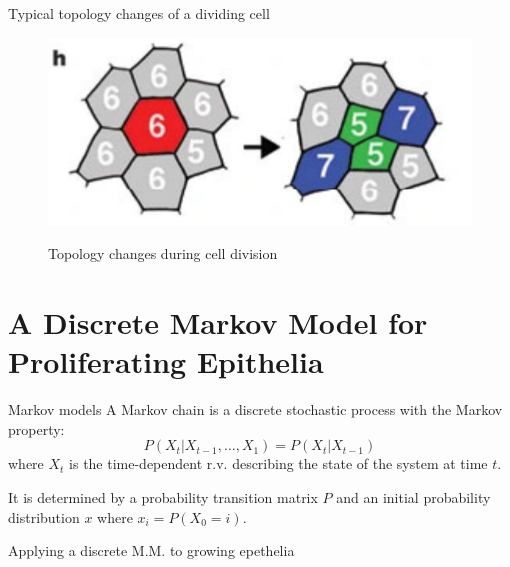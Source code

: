 \documentclass[aspectratio=169, 10pt]{beamer}
\begin{document}
\begin{frame}[fragile]{Typical topology changes of a dividing cell}
  \begin{figure}[]
    \centering
    \caption{Topology changes during cell division}
    \includegraphics[width=.5\textwidth]{figures/topology_evolution.png} 
    \label{}
  \end{figure}
\end{frame}

\section{A Discrete Markov Model for Proliferating Epithelia}

\begin{frame}[fragile]{Markov models}
    A Markov chain is a discrete stochastic process with the Markov property:
    \begin{equation*}
      P(X_t|X_{t-1},\ldots,X_1)=P(X_t|X_{t-1})
    \end{equation*}
    where $X_t$ is the time-dependent r.v. describing the state of the system at time $t$. 
    
    It is determined by a probability transition matrix $P$ and an initial probability distribution $x$ where $x_i=P(X_0=i)$. 

\end{frame}

\begin{frame}[fragile]{Applying a discrete M.M. to growing epethelia}
  \begin{columns}
    \column{\textwidth}
    \begin{table}
      \centering
    \end{table}
  \end{columns}
\end{frame}
\end{document}
